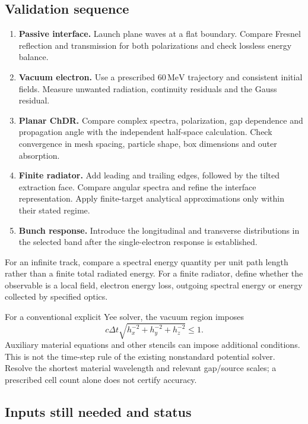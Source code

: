 \documentclass[11pt,a4paper]{article}
\newcommand{\unit}[1]{\,\mathrm{#1}}
\numberwithin{equation}{section}
\begin{document}
\subsection{Validation sequence}

\begin{enumerate}[itemsep=5pt]
 \item \textbf{Passive interface.} Launch plane waves at a flat boundary.
       Compare Fresnel reflection and transmission for both polarizations
       and check lossless energy balance.
 \item \textbf{Vacuum electron.} Use a prescribed \(60\unit{MeV}\)
       trajectory and consistent initial fields. Measure unwanted radiation,
       continuity residuals and the Gauss residual.
 \item \textbf{Planar ChDR.} Compare complex spectra, polarization, gap
       dependence and propagation angle with the independent half-space
       calculation. Check convergence in mesh spacing, particle shape,
       box dimensions and outer absorption.
 \item \textbf{Finite radiator.} Add leading and trailing edges, followed
       by the tilted extraction face. Compare angular spectra and refine
       the interface representation. Apply finite-target analytical
       approximations only within their stated regime.
 \item \textbf{Bunch response.} Introduce the longitudinal and transverse
       distributions in the selected band after the single-electron
       response is established.
\end{enumerate}

For an infinite track, compare a spectral energy quantity per unit path
length rather than a finite total radiated energy. For a finite radiator,
define whether the observable is a local field, electron energy loss,
outgoing spectral energy or energy collected by specified optics.

For a conventional explicit Yee solver, the vacuum region imposes
\begin{equation}
 c\Delta t\sqrt{h_x^{-2}+h_y^{-2}+h_z^{-2}}\leq1.
\end{equation}
Auxiliary material equations and other stencils can impose additional
conditions. This is not the time-step rule of the existing nonstandard
potential solver. Resolve the shortest material wavelength and relevant
gap/source scales; a prescribed cell count alone does not certify accuracy.

\subsection{Inputs still needed and status}
\end{document}
